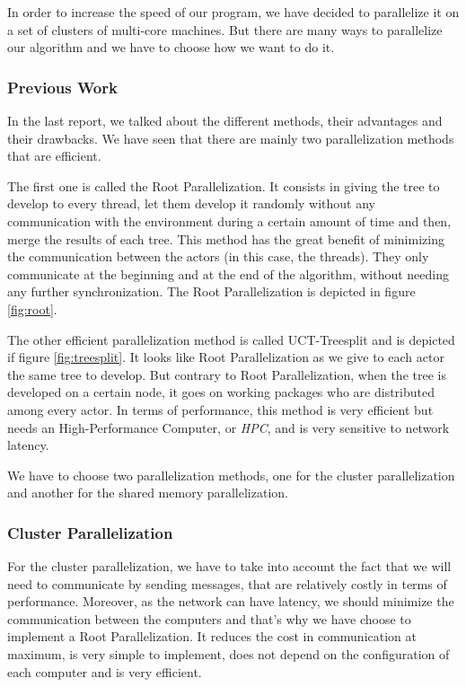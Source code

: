 In order to increase the speed of our program, we have decided to parallelize it on a set of clusters of multi-core machines. But there are many ways to parallelize our algorithm and we have to choose how we want to do it. 
\subsubsection{Previous Work}
In the last report, we talked about the different methods, their advantages and their drawbacks. We have seen that there are mainly two parallelization methods that are efficient.

The first one is called the Root Parallelization. It consists in giving the tree to develop to every thread, let them develop it randomly without any communication with the environment
during a certain amount of time and then, merge the results of each tree.
This method has the great benefit of minimizing the communication between the actors (in this case, the threads).
They only communicate at the beginning and at the end of the algorithm, without needing any further synchronization. The Root Parallelization is depicted in figure \ref{fig:root}.


The other efficient parallelization method is called UCT-Treesplit and is depicted if figure \ref{fig:treesplit}. It looks like Root Parallelization as we give to each actor the same tree to develop.
But contrary to Root Parallelization, when the tree is developed on a certain node, it goes on working packages who are distributed among every actor. %
In terms of performance, this method is very efficient but needs an High-Performance Computer, or \emph{HPC}, and is very sensitive to network latency.



We have to choose two parallelization methods, one for the cluster parallelization and another for the shared memory parallelization.
\subsubsection{Cluster Parallelization}
For the cluster parallelization, we have to take into account the fact that we will need to communicate by sending messages, that are relatively costly in terms of performance.
Moreover, as the network can have latency, we should minimize the communication between the computers and that's why we have choose to implement a Root Parallelization.
It reduces the cost in communication at maximum, is very simple to implement, does not depend on the configuration of each computer and is very efficient.
